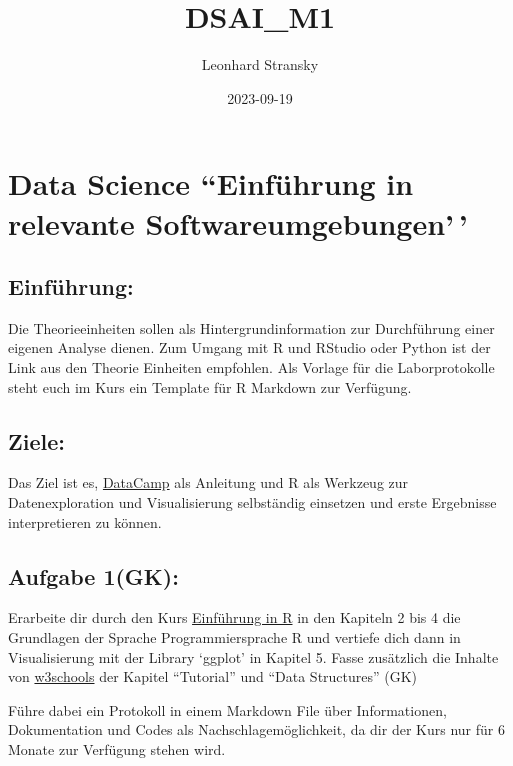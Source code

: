 \documentclass[
]{article}
\title{DSAI\_M1}
\author{Leonhard Stransky}
\date{2023-09-19}
\begin{document}
\maketitle

\hypertarget{data-science-einfuxfchrung-in-relevante-softwareumgebungen}{%
\section{Data Science ``Einführung in relevante
Softwareumgebungen'\,'}\label{data-science-einfuxfchrung-in-relevante-softwareumgebungen}}

\hypertarget{einfuxfchrung}{%
\subsection{Einführung:}\label{einfuxfchrung}}

Die Theorieeinheiten sollen als Hintergrundinformation zur Durchführung
einer eigenen Analyse dienen. Zum Umgang mit R und RStudio oder Python
ist der Link aus den Theorie Einheiten empfohlen. Als Vorlage für die
Laborprotokolle steht euch im Kurs ein Template für R Markdown zur
Verfügung.

\hypertarget{ziele}{%
\subsection{Ziele:}\label{ziele}}

Das Ziel ist es, \href{https://learn.datacamp.com/}{DataCamp} als
Anleitung und R als Werkzeug zur Datenexploration und Visualisierung
selbständig einsetzen und erste Ergebnisse interpretieren zu können.

\hypertarget{aufgabe-1gk}{%
\subsection{Aufgabe 1(GK):}\label{aufgabe-1gk}}

Erarbeite dir durch den Kurs
\href{https://methodenlehre.github.io/einfuehrung-in-R/}{Einführung in
R} in den Kapiteln 2 bis 4 die Grundlagen der Sprache Programmiersprache
R und vertiefe dich dann in Visualisierung mit der Library `ggplot' in
Kapitel 5. Fasse zusätzlich die Inhalte von
\href{https://www.w3schools.com/r/}{w3schools} der Kapitel ``Tutorial''
und ``Data Structures'' (GK)

Führe dabei ein Protokoll in einem Markdown File über Informationen,
Dokumentation und Codes als Nachschlagemöglichkeit, da dir der Kurs nur
für 6 Monate zur Verfügung stehen wird.
\end{document}
